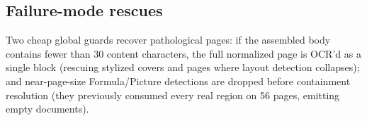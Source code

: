 \subsection{Failure-mode rescues}
\label{sec:rescues}

Two cheap global guards recover pathological pages: if the assembled body contains fewer than 30 content characters, the full normalized page is OCR'd as a single block (rescuing stylized covers and pages where layout detection collapses); and near-page-size Formula/Picture detections are dropped before containment resolution (they previously consumed every real region on 56 pages, emitting empty documents).
